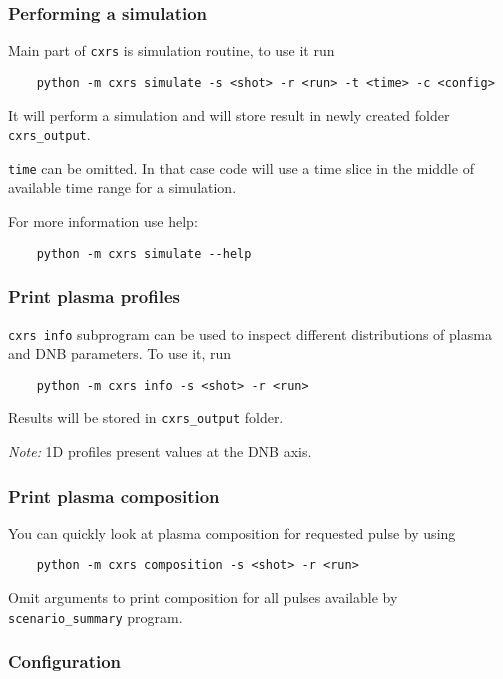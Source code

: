 \documentclass[../main.tex]{subfiles}
\begin{document}
\subsubsection{Performing a simulation}

Main part of \texttt{cxrs} is simulation routine, to use it run

\begin{verbatim}
    python -m cxrs simulate -s <shot> -r <run> -t <time> -c <config>
\end{verbatim}

It will perform a simulation and will store result in newly created folder \texttt{cxrs\_output}.

\texttt{time} can be omitted. In that case code will use a time slice in the middle of available time range for a simulation.

For more information use help:
\begin{verbatim}
    python -m cxrs simulate --help
\end{verbatim}

\subsubsection{Print plasma profiles}

\texttt{cxrs info} subprogram can be used to inspect different distributions of plasma and DNB parameters. To use it, run

\begin{verbatim}
    python -m cxrs info -s <shot> -r <run>
\end{verbatim}

Results will be stored in \texttt{cxrs\_output} folder.

\emph{Note:} 1D profiles present values at the DNB axis.

\subsubsection{Print plasma composition}

You can quickly look at plasma composition for requested pulse by using

\begin{verbatim}
    python -m cxrs composition -s <shot> -r <run>
\end{verbatim}


Omit arguments to print composition for all pulses available by \texttt{scenario\_summary} program.

\subsubsection{Configuration}
\end{document}
